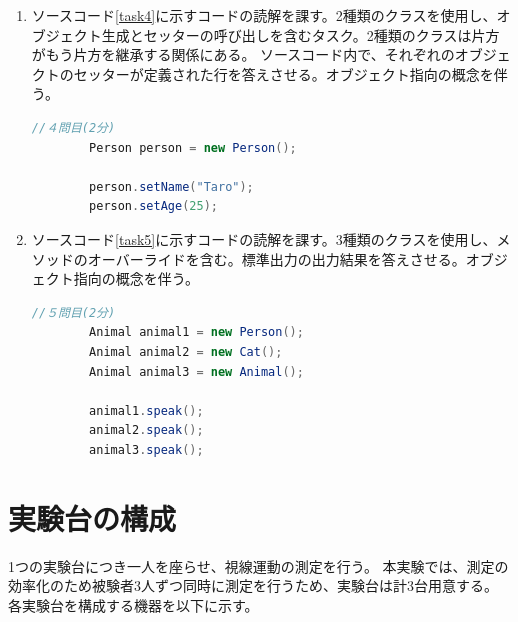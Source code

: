 \documentclass[paper=a4paper,fontsize=11pt]{jlreq}
\begin{document}
\begin{enumerate}[label=タスク\arabic*:]
      \item ソースコード\ref{task4}に示すコードの読解を課す。2種類のクラスを使用し、オブジェクト生成とセッターの呼び出しを含むタスク。2種類のクラスは片方がもう片方を継承する関係にある。
      ソースコード内で、それぞれのオブジェクトのセッターが定義された行を答えさせる。オブジェクト指向の概念を伴う。
      \begin{lstlisting}[language=Java,caption=タスク4のソースコード, label=task4]
        //４問目(2分)
        Person person = new Person();

        person.setName("Taro");
        person.setAge(25);
      \end{lstlisting}
      \pagebreak

      \item ソースコード\ref{task5}に示すコードの読解を課す。3種類のクラスを使用し、メソッドのオーバーライドを含む。標準出力の出力結果を答えさせる。オブジェクト指向の概念を伴う。
      \begin{lstlisting}[language=Java,caption=タスク5のソースコード, label=task5]
        //５問目(2分)
        Animal animal1 = new Person();
        Animal animal2 = new Cat();
        Animal animal3 = new Animal();

        animal1.speak();
        animal2.speak();
        animal3.speak();
      \end{lstlisting}
    \end{enumerate}

    \pagebreak

  \section{実験台の構成}
    1つの実験台につき一人を座らせ、視線運動の測定を行う。
    本実験では、測定の効率化のため被験者3人ずつ同時に測定を行うため、実験台は計3台用意する。
    各実験台を構成する機器を以下に示す。
\end{document}
